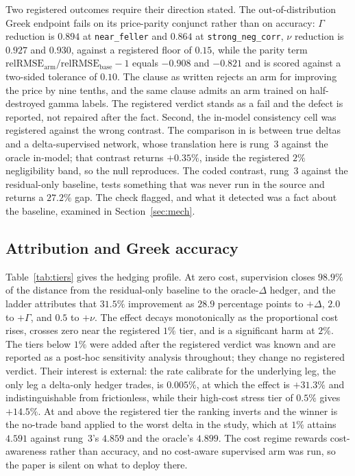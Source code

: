 \documentclass[10pt]{article}
\begin{document}
Two registered outcomes require their direction stated. The out-of-distribution
Greek endpoint fails on its price-parity conjunct rather than on accuracy:
$\Gamma$ reduction is $0.894$ at \texttt{near\_feller} and $0.864$ at
\texttt{strong\_neg\_corr}, $\nu$ reduction is $0.927$ and $0.930$, against a
registered floor of $0.15$, while the parity term
$\mathrm{relRMSE}_{\mathrm{arm}}/\mathrm{relRMSE}_{\mathrm{base}}-1$ equals $-0.908$
and $-0.821$ and is scored against a two-sided tolerance of $0.10$. The clause as
written rejects an arm for improving the price by nine tenths, and the same clause
admits an arm trained on half-destroyed gamma labels. The registered verdict stands
as a fail and the defect is reported, not repaired after the fact. Second, the
in-model consistency cell was registered against the wrong contrast. The comparison
in \citet{sakuma2026a} is between true deltas and a delta-supervised network, whose
translation here is rung~3 against the oracle in-model; that contrast returns
$+0.35\%$, inside the registered $2\%$ negligibility band, so the null reproduces.
The coded contrast, rung~3 against the residual-only baseline, tests something that
was never run in the source and returns a $27.2\%$ gap. The check flagged, and what
it detected was a fact about the baseline, examined in Section~\ref{sec:mech}.

\subsection{Attribution and Greek accuracy}
\label{sec:attr}

Table~\ref{tab:tiers} gives the hedging profile. At zero cost, supervision closes
$98.9\%$ of the distance from the residual-only baseline to the oracle-$\Delta$
hedger, and the ladder attributes that $31.5\%$ improvement as $28.9$ percentage
points to $+\Delta$, $2.0$ to $+\Gamma$, and $0.5$ to $+\nu$. The effect decays
monotonically as the proportional cost rises, crosses zero near the registered $1\%$
tier, and is a significant harm at $2\%$. The tiers below $1\%$ were added after the
registered verdict was known and are reported as a post-hoc sensitivity analysis
throughout; they change no registered verdict. Their interest is external: the rate
\citet{armstrong2024deep} calibrate for the underlying leg, the only leg a
delta-only hedger trades, is $0.005\%$, at which the effect is $+31.3\%$ and
indistinguishable from frictionless, while their high-cost stress tier of $0.5\%$
gives $+14.5\%$. At and above the registered tier the ranking inverts and the
winner is the no-trade band applied to the worst delta in the study, which at $1\%$
attains $4.591$ against rung~3's $4.859$ and the oracle's $4.899$. The cost regime
rewards cost-awareness rather than accuracy, and no cost-aware supervised arm was
run, so the paper is silent on what to deploy there.
\end{document}
